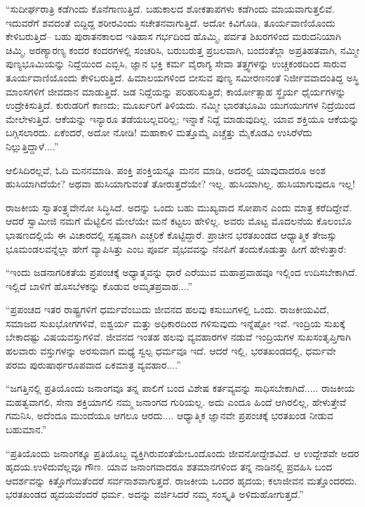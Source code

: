 “ಸುದೀರ್ಘರಾತ್ರಿ ಕಡೆಗಿಂದು ಕೊನೆಗಾಣುತ್ತಿದೆ. ಬಹುಕಾಲದ ಶೋಕತಾಪಗಳು ಕಡೆಗಿಂದು ಮಾಯವಾಗುತ್ತಲಿವೆ. ಇದುವರೆಗೆ ಶವದಂತೆ ಬಿದ್ದಿದ್ದ ಶರೀರವಿಂದು ಸಚೇತನವಾಗುತ್ತಿದೆ. ಅದೋ ಕಿವಿಗೊಡಿ, ತೂರ್ಯವಾಣಿಯೊಂದು ಕೇಳಿಬರುತ್ತಿದೆ– ಬಹು ಪುರಾತನಕಾಲದ ಇತಿಹಾಸ ಗರ್ಭದಿಂದ ಹೊಮ್ಮಿ, ಪರ್ವತ ಶಿಖರಗಳಿಂದ ಮರುದನಿಯಾಗಿ ಚಿಮ್ಮಿ, ಅರಣ್ಯಾರಣ್ಯ ಕಂದರ ಕಂದರಗಳಲ್ಲಿ ಸಂಚರಿಸಿ, ಬರುಬರುತ್ತ ಪ್ರಬಲವಾಗಿ, ಬಂದಂತೆಲ್ಲಾ ಅಪ್ರತಿಹತವಾಗಿ, ನಮ್ಮೀ ಪುಣ್ಯಭೂಮಿಯನ್ನು ನಿದ್ದೆಯಿಂದ ಎಬ್ಬಿಸಿ, ಜ್ಞಾನ ಭಕ್ತಿ ಕರ್ಮ ವೈರಾಗ್ಯ ಸೇವಾ ತತ್ತ್ವಗಳನ್ನು ಉಚ್ಚಕಂಠದಿಂದ ಸಾರುವ ತೂರ್ಯವಾಣಿಯೊಂದು ಕೇಳಿಬರುತ್ತಿದೆ. ಹಿಮಾಲಯಗಳಿಂದ ಬೀಸುವ ಪುಣ್ಯ ಸಮೀರಣನಂತೆ ನಿರ್ಜೀವವಾದಂತಿದ್ದ ಅಸ್ಥಿ ಮಾಂಸಗಳಿಗೆ ಜೀವದಾನ ಮಾಡುತ್ತಿದೆ. ಜಡ ನಿದ್ದೆಯನ್ನು ಪರಿಹರಿಸುತ್ತಿದೆ; ಕಾರ್ಯೋತ್ಸಾಹ ಸ್ಥೈರ್ಯ ಧೈರ್ಯಗಳನ್ನು ಉದ್ರೇಕಿಸುತ್ತಿದೆ. ಕುರುಡರಿಗೆ ಕಾಣದು; ಮೂರ್ಖರಿಗೆ ತಿಳಿಯದು. ನಮ್ಮೀ ಭಾರತಭೂಮಿ ಯುಗಯುಗಗಳ ನಿದ್ರೆಯಿಂದ ಮೇಲೇಳುತ್ತಿದೆ. ಆಕೆಯನ್ನು ಇನ್ಯಾರೂ ತಡೆಯಬಲ್ಲವರಿಲ್ಲ; ಇನ್ನಾಕೆ ನಿದ್ದೆ ಮಾಡುವುದಿಲ್ಲ. ಯಾವ ಶಕ್ತಿಯೂ ಆಕೆಯನ್ನು ಬಗ್ಗಿಸಲಾರದು. ಏಕೆಂದರೆ, ಅದೋ ನೋಡಿ! ಮಹಾಕಾಳಿ ಮತ್ತೊಮ್ಮೆ ಎಚ್ಚೆತ್ತು ಮೈಕೊಡವಿ ಉಸಿರೆಳೆದು ನಿಲ್ಲುತ್ತಿದ್ದಾಳೆ....”

\newpage

ಆಲಿಸಿದಿರಲ್ಲವೆ, ಓದಿ ಮನನಮಾಡಿ. ಪಂಕ್ತಿ ಪಂಕ್ತಿಯನ್ನೂ ಮನನ ಮಾಡಿ, ಅದರಲ್ಲಿ ಯಾವುದಾದರೂ ಅಂಶ ಹುಸಿಯಾಗಿದೆಯೇ? ಅಥವಾ ಹುಸಿಯಾಗುವಂತೆ ತೋರುತ್ತದೆಯೇ? ಇಲ್ಲ. ಹುಸಿಯಾಗಿಲ್ಲ. ಹುಸಿಯಾಗುವುದೂ ಇಲ್ಲ!

ರಾಜಕೀಯ ಸ್ವಾತಂತ್ರ್ಯವೇನೋ ಸಿದ್ಧಿಸಿದೆ. ಅದನ್ನು ಒಂದು ಬಹು ಮುಖ್ಯವಾದ ಸೋಪಾನ ಎಂದು ಮಾತ್ರ ಕರೆದಿದ್ದೇವೆ. ಆದರೆ ಸ್ವಾಮೀಜಿ ನಮಗೆ ಮೆಟ್ಟಿಲಿನ ಮೇಲೆಯೇ ಮನೆ ಕಟ್ಟಲು ಹೇಳಿಲ್ಲ. ಅವರು ಮೊಟ್ಟ ಮೊದಲನೆಯ ಕೊಲಂಬೊ ಭಾಷಣದಲ್ಲಿಯೆ ಈ ವಿಚಾರದಲ್ಲಿ ಸ್ಪಷ್ಟವಾಗಿ ಎಚ್ಚರಿಕೆ ಕೊಟ್ಟಿದ್ದಾರೆ. ಪ್ರಾಚೀನ ಭರತಖಂಡದ ಆಧ್ಯಾತ್ಮಿಕ ತೇಜಸ್ಸು ಭೂಮಂಡಲವನ್ನೆಲ್ಲಾ ಹೇಗೆ ವ್ಯಾಪಿಸಿತ್ತು ಎಂಬ ಪೂರ್ವ ವೈಭವವನ್ನು ನೆನಪಿಗೆ ತಂದುಕೊಡುತ್ತಾ ಹೀಗೆ ಹೇಳುತ್ತಾರೆ:

“ಇಂದು ಜಡನಾಗರಿಕತೆಯ ಪ್ರಪಂಚಕ್ಕೆ ಅಧ್ಯಾತ್ಮವನ್ನು ಧಾರೆ ಎರೆಯುವ ಮಹಾಪ್ರವಾಹವೂ ಇಲ್ಲಿಂದ ಉದಿಸಬೇಕಾಗಿದೆ. ಇಲ್ಲಿದೆ ಬಾಳಿಗೆ ಹೊಸಬೆಳಕನ್ನು ಕೊಡುವ ಅಮೃತಪ್ರವಾಹ....”

“ಪ್ರಪಂಚದ ಇತರ ರಾಷ್ಟ್ರಗಳಿಗೆ ಧರ್ಮವೆಂಬುದು ಜೀವನದ ಹಲವು ಕಸುಬುಗಳಲ್ಲಿ ಒಂದು. ರಾಜಕೀಯವಿದೆ, ಸಮಾಜದ ಸುಖಭೋಗಗಳಿವೆ, ಐಶ್ವರ್ಯ ಮತ್ತು ಅಧಿಕಾರದಿಂದ ಗಳಿಸುವುದು ಇನ್ನೆಷ್ಟೋ ಇವೆ. ಇಂದ್ರಿಯ ಸುಖಕ್ಕೆ ಬೇಕಾದಷ್ಟು ವಿಷಯವಸ್ತುಗಳಿವೆ. ಜೀವನದ ಇಂತಹ ಹಲವು ವ್ಯವಹಾರಗಳ ನಡುವೆ ಇಂದ್ರಿಯಗಳ ಸುಖಸಂತೃಪ್ತಿಗಾಗಿ ಹಲವಾರು ವಸ್ತುಗಳನ್ನು ಅರಸುವಾಗ ಮಧ್ಯೆ ಸ್ವಲ್ಪ ಧರ್ಮವೂ ಇದೆ. ಆದರೆ ಇಲ್ಲಿ, ಭರತಖಂಡದಲ್ಲಿ, ಧರ್ಮವೇ ಪರಮ ಪುರುಷಾರ್ಥರೂಪವಾದ ಏಕಮಾತ್ರ ವ್ಯವಹಾರ....”

“ಜಗತ್ತಿನಲ್ಲಿ ಪ್ರತಿಯೊಂದು ಜನಾಂಗವೂ ತನ್ನ ಪಾಲಿಗೆ ಬಂದ ವಿಶೇಷ ಕರ್ತವ್ಯವನ್ನು ಸಾಧಿಸಬೇಕಾಗಿದೆ..... ರಾಜಕೀಯ ಮಹತ್ವವಾಗಲಿ, ಸೇನಾ ಶಕ್ತಿಯಾಗಲಿ ನಮ್ಮ ಜನಾಂಗದ ಗುರಿಯಲ್ಲ. ಅದು ಎಂದೂ ಹಿಂದೆ ಆಗಿರಲಿಲ್ಲ, ಹೇಳುತ್ತೇವೆ ಗಮನಿಸಿ, ಅದೆಂದೂ ಮುಂದೆಯೂ ಆಗಲೂ ಆರದು.... ಆಧ್ಯಾತ್ಮಿಕ ಜ್ಞಾನವೇ ಪ್ರಪಂಚಕ್ಕೆ ಭರತಖಂಡ ನೀಡುವ ಬಹುಮಾನ.”

“ಪ್ರತಿಯೊಂದು ಜನಾಂಗಕ್ಕೂ ಪ್ರತಿಯೊಬ್ಬ ವ್ಯಕ್ತಿಗಿರುವಂತೆಯೇ\break ಒಂದೊಂದು ಜೀವನೋದ್ದೇಶವಿದೆ. ಆ ಉದ್ದೇಶವೇ ಅದರ ಹೃದಯ.\break ಉಳಿದುವೆಲ್ಲವೂ ಗೌಣ. ಯಾವ ಜನಾಂಗವಾದರೂ ಶತಮಾನಗಳಿಂದ ತನ್ನ ನಾಡಿನಲ್ಲಿ ಪ್ರವಹಿಸಿ ಬಂದ ಆದರ್ಶವನ್ನು ಕಿತ್ತೊಗೆಯಿತೆಂದರೆ ಸರ್ವನಾಶವಾಗುತ್ತದೆ. ರಾಜಕೀಯ ಒಂದರ ಹೃದಯ; ಕಲಾಜೀವನ ಮತ್ತೊಂದರದು. ಭರತಖಂಡದ ಹೃದಯವೆಂದರೆ ಧರ್ಮ. ಅದನ್ನು ವರ್ಜಿಸಿದರೆ ನಮ್ಮ ಸಂಸ್ಕೃತಿ ಅಳಿದುಹೋಗುತ್ತದೆ.”

